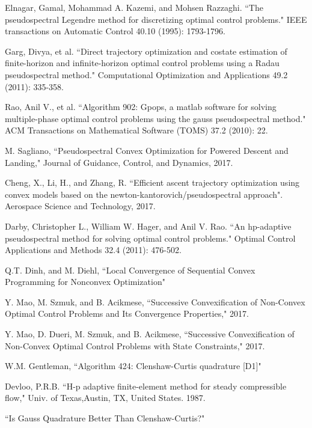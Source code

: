 \documentclass[10pt,a4paper]{article}
\begin{document}
\begin{thebibliography}{1}
		Elnagar, Gamal, Mohammad A. Kazemi, and Mohsen Razzaghi. ``The pseudospectral Legendre method for discretizing optimal control problems." IEEE transactions on Automatic Control 40.10 (1995): 1793-1796.
		
		Garg, Divya, et al. ``Direct trajectory optimization and costate estimation of finite-horizon and infinite-horizon optimal control problems using a Radau pseudospectral method." Computational Optimization and Applications 49.2 (2011): 335-358.
		
		Rao, Anil V., et al. ``Algorithm 902: Gpops, a matlab software for solving multiple-phase optimal control problems using the gauss pseudospectral method." ACM Transactions on Mathematical Software (TOMS) 37.2 (2010): 22.				
					
				
		M. Sagliano, ``Pseudospectral Convex Optimization for Powered Descent and Landing," Journal of Guidance, Control, and Dynamics, 2017.
		
		Cheng, X., Li, H., and Zhang, R. ``Efficient ascent trajectory optimization using convex models based on the newton-kantorovich/pseudospectral approach". Aerospace Science and Technology, 2017.
		
		Darby, Christopher L., William W. Hager, and Anil V. Rao. ``An hp-adaptive pseudospectral method for solving optimal control problems." Optimal Control Applications and Methods 32.4 (2011): 476-502.
		
		Q.T. Dinh, and M. Diehl, ``Local Convergence of Sequential Convex Programming for Nonconvex Optimization"
		
		Y. Mao, M. Szmuk, and B. Acikmese, ``Successive Convexification of Non-Convex Optimal Control Problems and Its Convergence Properties," 2017.
		
		Y. Mao, D. Dueri, M. Szmuk, and B. Acikmese, ``Successive Convexification of Non-Convex Optimal Control Problems with State Constraints," 2017.
		
		W.M. Gentleman, ``Algorithm 424: Clenshaw-Curtis quadrature [D1]"
		
		Devloo, P.R.B. ``H-p adaptive finite-element method for steady compressible flow," Univ. of Texas,Austin, TX, United States. 1987.
		
		``Is Gauss Quadrature Better Than Clenshaw-Curtis?"
		
	\end{thebibliography}
\end{document}
